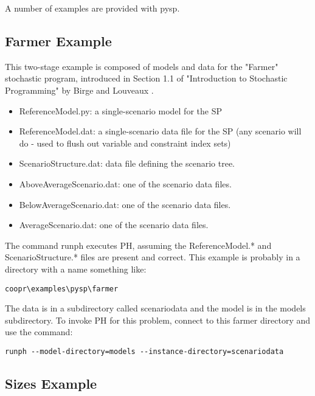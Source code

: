 A number of examples are provided with pysp.

\subsection{Farmer Example}

This two-stage example is composed of models and data for the "Farmer"
stochastic program, introduced in Section 1.1 of "Introduction to Stochastic
Programming" by Birge and Louveaux \cite{spbook}.

\begin{itemize}
  \item ReferenceModel.py: a single-scenario model for the SP

  \item ReferenceModel.dat: a single-scenario data file for the SP (any scenario
  will do - used to flush out variable and constraint index sets)

  \item ScenarioStructure.dat: data file defining the scenario tree.

  \item AboveAverageScenario.dat: one of the scenario data files.

  \item BelowAverageScenario.dat: one of the scenario data files.

  \item AverageScenario.dat: one of the scenario data files.
\end{itemize}

The command runph executes PH, assuming the ReferenceModel.* and
ScenarioStructure.* files are present and correct. This example is probably in a
directory with a name something like:

\begin{verbatim}
coopr\examples\pysp\farmer
\end{verbatim}

The data is in a subdirectory called scenariodata and the model is in the models
subdirectory. To invoke PH for this problem, connect to this farmer directory
and use the command:

\begin{verbatim}
runph --model-directory=models --instance-directory=scenariodata
\end{verbatim}

\subsection{Sizes Example}

